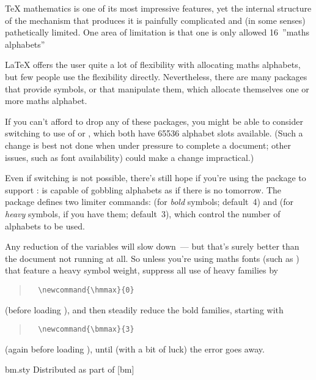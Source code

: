{\TeX{} mathematics is one of its most impressive features, yet the
internal structure of the mechanism that produces it is painfully
complicated and (in some senses) pathetically limited.  One area of
limitation is that one is only allowed 16~''maths alphabets''

\LaTeX{} offers the user quite a lot of flexibility with allocating
maths alphabets, but few people use the flexibility directly.
Nevertheless, there are many packages that provide symbols, or that
manipulate them, which allocate themselves one or more maths alphabet.

If you can't afford to drop any of these packages, you might be able
to consider switching to use of  or
, which both have 65536 alphabet slots
available.  (Such a change is best not done when under pressure to
complete a document; other issues, such as font availability) could
make a change impractical.)

Even if switching is not possible, there's still hope if you're using
the  package to support :
 is capable of gobbling alphabets as if there is no
tomorrow.  The package defines two limiter commands:  (for
\emph{bold} symbols; default~4) and  (for \emph{heavy}
symbols, if you have them; default~3), which control the number of
alphabets to be used.

Any reduction of the  variables will slow
 down~--- but that's surely better than the document not
running at all.  So unless you're using maths fonts (such as
) that feature a heavy symbol weight, suppress all
use of heavy families by
\begin{quote}
\begin{verbatim}
  \newcommand{\hmmax}{0}
\end{verbatim}
\end{quote}
(before loading ), and then steadily reduce the bold
families, starting with 
\begin{quote}
\begin{verbatim}
  \newcommand{\bmmax}{3}
\end{verbatim}
\end{quote}
(again before loading ), until (with a bit of luck) the
error goes away.
\begin{ctanrefs}
\item[bm.sty]Distributed as part of [bm]
\end{ctanrefs}

}
